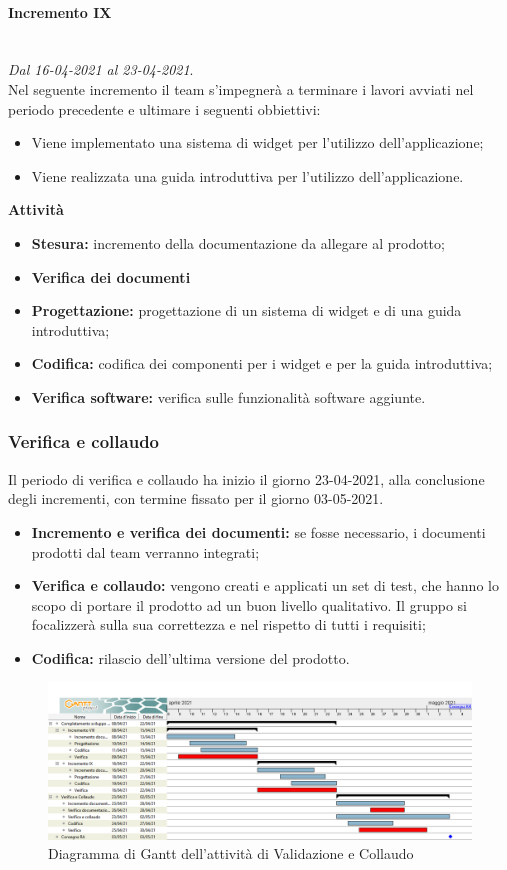 \paragraph{Incremento IX}\textit{}\\
\textit{Dal 16-04-2021 al 23-04-2021}. \\ 
Nel seguente incremento il team s'impegnerà a terminare i lavori avviati nel periodo precedente e ultimare i seguenti obbiettivi:
\begin{itemize}
	\item Viene implementato una sistema di widget per l'utilizzo dell'applicazione;
	\item Viene realizzata una guida introduttiva per l'utilizzo dell'applicazione.
\end{itemize}			
\textbf{Attività}			
\begin{itemize}
\item \textbf{Stesura:} incremento della documentazione da allegare al prodotto;
\item \textbf{Verifica dei documenti} 
\item \textbf{Progettazione:} progettazione di un sistema di widget e di una guida introduttiva;
\item \textbf{Codifica:} codifica dei componenti per i widget e per la guida introduttiva;
\item \textbf{Verifica software:} verifica sulle funzionalità software aggiunte.
\end{itemize}
\subsubsection{Verifica e collaudo}
Il periodo di verifica e collaudo ha inizio il giorno 23-04-2021, alla conclusione degli incrementi, con termine fissato per il giorno 03-05-2021.
\begin{itemize}
	\item \textbf{Incremento e verifica dei documenti:} se fosse necessario, i documenti prodotti dal team verranno integrati;
	\item \textbf{Verifica e collaudo:} vengono creati e applicati un set di test, che hanno lo scopo di portare il prodotto ad un buon livello qualitativo. Il gruppo si focalizzerà sulla sua correttezza e nel rispetto di tutti i requisiti;
	\item \textbf{Codifica:} rilascio dell'ultima versione del prodotto.
\end{itemize}

\begin{landscape}
\begin{figure}[h]
	\centering
	\includegraphics[width=\linewidth]{Images/GanttPianificazioneValidazioneCollaudo.PNG}
	\caption{Diagramma di Gantt dell'attività di Validazione e Collaudo}
\end{figure}
\end{landscape}



